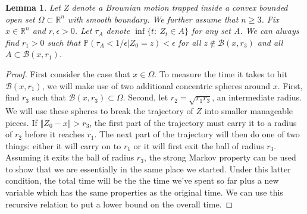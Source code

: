 \documentclass[12pt, nofootinbib,english, amsmath, amssymb, aps, priprint, graphicx,floatfix]{revtex4-1}
\newtheorem{lemma}{Lemma}
\theoremstyle{plain}
\theoremstyle{definition}
\theoremstyle{plain}
\newcommand{\bb}[1]{\mathcal{B}\left(#1\right)}
\begin{document}
\begin{lemma}
\label{lem:longtime_diamater}
Let Z denote a Brownian motion trapped inside a convex bounded open set $\Omega\subset\mathbb{R}^{n}$ with smooth boundary.  We further assume that $n\geq3$. Fix $x\in\mathbb{R}^{n}$ and $r,\epsilon>0$. Let $\tau_{A}$ denote $\inf\{t:\ Z_{t}\in A\}$ for any set A. We can always find $r_1>0$ such that $\mathbb{P}(\tau_{A}<1/\epsilon|Z_{0}=z)<\epsilon$ for all $z\notin\bb{x,r_3}$ and all $A\subset\bb{x,r_1}$.
\end{lemma}
\begin{proof}
First consider the case that $x \in \Omega$.  To measure the time it takes to hit $\bb{x,r_1}$, we will make use of two additional concentric spheres around $x$.  First, find $r_3$ such that $\bb{x,r_3} \subset \Omega$.  Second, let $r_2 =\sqrt{r_1 r_3}$, an intermediate radius.    We will use these spheres to break the trajectory of $Z$ into smaller manageable pieces. If $\left\Vert Z_{0}-x\right\Vert >r_3$,
the first part of the trajectory must carry it to a radius of $r_2$ before it reaches $r_1$.
The next part of the trajectory will then do one of two things: either
it will carry on to $r_1$ or it will first exit the ball of radius
$r_3$. Assuming it exits the ball of radius $r_3$, the strong Markov
property can be used to show that we are essentially in the same place
we started. Under this latter condition, the total time will be the
the time we've spent so far plus a new variable which has the same
properties as the original time. We can use this recursive relation to put a lower
bound on the overall time.


\end{proof}
\end{document}
